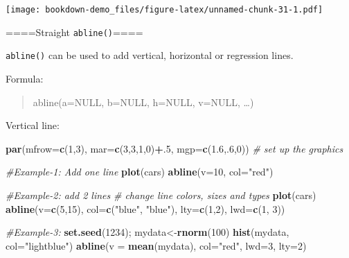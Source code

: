 \documentclass[]{book}
\newenvironment{Shaded}{\begin{snugshade}}{\end{snugshade}}
\newcommand{\KeywordTok}[1]{\textcolor[rgb]{0.13,0.29,0.53}{\textbf{#1}}}
\newcommand{\DataTypeTok}[1]{\textcolor[rgb]{0.13,0.29,0.53}{#1}}
\newcommand{\DecValTok}[1]{\textcolor[rgb]{0.00,0.00,0.81}{#1}}
\newcommand{\FloatTok}[1]{\textcolor[rgb]{0.00,0.00,0.81}{#1}}
\newcommand{\StringTok}[1]{\textcolor[rgb]{0.31,0.60,0.02}{#1}}
\newcommand{\CommentTok}[1]{\textcolor[rgb]{0.56,0.35,0.01}{\textit{#1}}}
\newcommand{\OperatorTok}[1]{\textcolor[rgb]{0.81,0.36,0.00}{\textbf{#1}}}
\newcommand{\NormalTok}[1]{#1}
\begin{document}
\texttt{[image: bookdown-demo\_files/figure-latex/unnamed-chunk-31-1.pdf]}

====Straight \texttt{abline()}====

\texttt{abline()} can be used to add vertical, horizontal or regression
lines.

Formula:

\begin{quote}
abline(a=NULL, b=NULL, h=NULL, v=NULL, \ldots{})
\end{quote}

Vertical line:

\begin{Shaded}
\begin{Highlighting}[]
\KeywordTok{par}\NormalTok{(}\DataTypeTok{mfrow=}\KeywordTok{c}\NormalTok{(}\DecValTok{1}\NormalTok{,}\DecValTok{3}\NormalTok{), }\DataTypeTok{mar=}\KeywordTok{c}\NormalTok{(}\DecValTok{3}\NormalTok{,}\DecValTok{3}\NormalTok{,}\DecValTok{1}\NormalTok{,}\DecValTok{0}\NormalTok{)}\OperatorTok{+}\NormalTok{.}\DecValTok{5}\NormalTok{, }\DataTypeTok{mgp=}\KeywordTok{c}\NormalTok{(}\FloatTok{1.6}\NormalTok{,.}\DecValTok{6}\NormalTok{,}\DecValTok{0}\NormalTok{))  }\CommentTok{# set up the graphics}

\CommentTok{#Example-1: Add one line}
\KeywordTok{plot}\NormalTok{(cars)}
\KeywordTok{abline}\NormalTok{(}\DataTypeTok{v=}\DecValTok{10}\NormalTok{, }\DataTypeTok{col=}\StringTok{"red"}\NormalTok{)}

\CommentTok{#Example-2: add 2 lines }
\CommentTok{# change line colors, sizes and types}
\KeywordTok{plot}\NormalTok{(cars)}
\KeywordTok{abline}\NormalTok{(}\DataTypeTok{v=}\KeywordTok{c}\NormalTok{(}\DecValTok{5}\NormalTok{,}\DecValTok{15}\NormalTok{), }\DataTypeTok{col=}\KeywordTok{c}\NormalTok{(}\StringTok{"blue"}\NormalTok{, }\StringTok{"blue"}\NormalTok{), }\DataTypeTok{lty=}\KeywordTok{c}\NormalTok{(}\DecValTok{1}\NormalTok{,}\DecValTok{2}\NormalTok{), }\DataTypeTok{lwd=}\KeywordTok{c}\NormalTok{(}\DecValTok{1}\NormalTok{, }\DecValTok{3}\NormalTok{))}

\CommentTok{#Example-3:}
\KeywordTok{set.seed}\NormalTok{(}\DecValTok{1234}\NormalTok{); mydata<-}\KeywordTok{rnorm}\NormalTok{(}\DecValTok{100}\NormalTok{)}
\KeywordTok{hist}\NormalTok{(mydata, }\DataTypeTok{col=}\StringTok{"lightblue"}\NormalTok{)}
\KeywordTok{abline}\NormalTok{(}\DataTypeTok{v =} \KeywordTok{mean}\NormalTok{(mydata), }\DataTypeTok{col=}\StringTok{"red"}\NormalTok{, }\DataTypeTok{lwd=}\DecValTok{3}\NormalTok{, }\DataTypeTok{lty=}\DecValTok{2}\NormalTok{)}
\end{Highlighting}
\end{Shaded}
\end{document}
